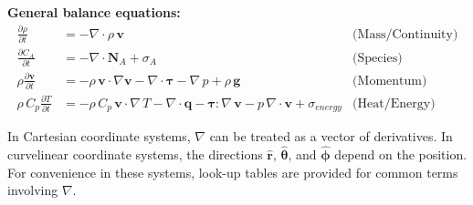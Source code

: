 \begin{datasheet}
{\bf General balance equations:}
\begin{align}
  \frac{\partial\rho}{\partial t} &= -\nabla \cdot \rho\,\bm{v}\label{eq:continuity} & \text{(Mass/Continuity)}\\
  \frac{\partial C_A}{\partial t} &= -\nabla\cdot\bm{N}_{A} + \sigma_A& \text{(Species)}\\
  \rho \frac{\partial\bm{v}}{\partial t} &= -\rho\,\bm{v}\cdot\nabla
  \bm{v}
  - \nabla\cdot\bm{\tau} - \nabla\,p + \rho\,\bm{g}\label{eq:momentumbalance} & \text{(Momentum)}\\
  \rho\,C_p\frac{\partial T}{\partial t} &= -\rho\,C_p\,\bm{v}
  \cdot\nabla\,T - \nabla\cdot\bm{q} - \bm{\tau}:\nabla\,\bm{v} -
  p\,\nabla\cdot\bm{v} +\sigma_{energy}\label{eq:energybalance} &
  \text{(Heat/Energy)}
\end{align}

In Cartesian coordinate systems, $\nabla$ can be treated as a vector of
derivatives. In curvelinear coordinate systems, the directions
$\hat{\bm{r}}$, $\hat{\bm{\theta}}$, and $\hat{\bm{\phi}}$ depend on
the position. For convenience in these systems, look-up tables are
provided for common terms involving $\nabla$.


\end{datasheet}

